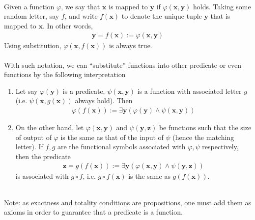 \documentclass{treatise}
\begin{document}
\begin{shaded}
\begin{enumerate}
\end{enumerate}
\ \\
Given a function $\varphi$, we say that $\mathbf{x}$ is mapped to $\mathbf{y}$ if $\varphi(\mathbf{x}, \mathbf{y})$ holds. Taking some random letter, say $f$, and write $f(\mathbf{x})$ to denote the unique tuple $\mathbf{y}$ that is mapped to $\mathbf{x}$. In other words,
\begin{gather*}
    \mathbf{y} = f(\mathbf{x}) := \varphi(\mathbf{x}, \mathbf{y})
\end{gather*}
Using substitution, $\varphi(\mathbf{x}, f(\mathbf{x}))$ is always true.
\\
\\
With such notation, we can ``substitute'' functions into other predicate or even functions by the following interpretation
\begin{enumerate}
    \item Let say $\varphi(\mathbf{y})$ is a predicate, $\psi(\mathbf{x}, \mathbf{y})$ is a function with associated letter $g$ (i.e. $\psi(\mathbf{x}, g(\mathbf{x}))$ always hold). Then
    \begin{gather*}
        \varphi(f(\mathbf{x})) := \exists \mathbf{y} \left( \varphi(\mathbf{y}) \wedge \psi(\mathbf{x}, \mathbf{y}) \right)
    \end{gather*}
    \item On the other hand, let $\varphi(\mathbf{x}, \mathbf{y})$ and $\psi(\mathbf{y}, \mathbf{z})$ be functions such that the size of output of $\varphi$ is the same as that of the input of $\psi$ (hence the matching letter). If $f, g$ are the functional symbols associated with $\varphi, \psi$ respectively, then the predicate
    \begin{gather*}
        \mathbf{z} = g(f(\mathbf{x})) := \exists \mathbf{y} \left( \varphi(\mathbf{x}, \mathbf{y}) \wedge \psi(\mathbf{y}, \mathbf{z}) \right)
    \end{gather*}
    is associated with $g \circ f$, i.e. $g \circ f(\mathbf{x})$ is the same as $g(f(\mathbf{x}))$.
\end{enumerate}
\ \\
\underline{Note:} as exactness and totality conditions are propositions, one must add them as axioms in order to guarantee that a predicate is a function.


\end{shaded}
\end{document}
